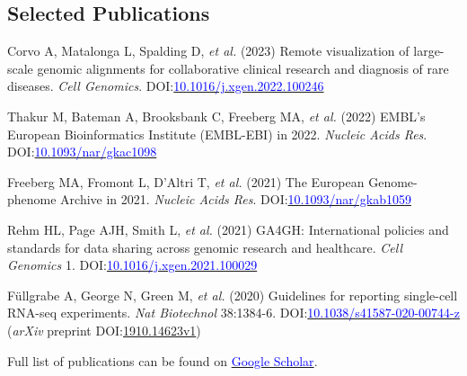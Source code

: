 \documentclass[margin,line]{res}
\begin{document}
\begin{resume}
\section{\sc Selected Publications}

Corvo A, Matalonga L, Spalding D, {\em et al.} (2023) Remote visualization of large-scale genomic alignments for collaborative clinical research and diagnosis of rare diseases. {\em Cell Genomics}. DOI:\href{https://doi.org/10.1016/j.xgen.2022.100246}{\textcolor{blue}{10.1016/j.xgen.2022.100246}}

Thakur M, Bateman A, Brooksbank C, Freeberg MA, {\em et al.} (2022) EMBL's European Bioinformatics Institute (EMBL-EBI) in 2022. {\em Nucleic Acids Res}. DOI:\href{https://doi.org/10.1093/nar/gkac1098}{\textcolor{blue}{10.1093/nar/gkac1098}}

Freeberg MA, Fromont L, D'Altri T, {\em et al.} (2021) The European Genome-phenome Archive in 2021. {\em Nucleic Acids Res}. DOI:\href{https://doi.org/10.1093/nar/gkab1059}{\textcolor{blue}{10.1093/nar/gkab1059}}

Rehm HL, Page AJH, Smith L, {\em et al.} (2021) GA4GH: International policies and standards for data sharing across genomic research and healthcare. {\em Cell Genomics} 1. DOI:\href{https://doi.org/10.1016/j.xgen.2021.100029}{\textcolor{blue}{10.1016/j.xgen.2021.100029}}


Füllgrabe A, George N, Green M, {\em et al.} (2020) Guidelines for reporting single-cell RNA-seq experiments. {\em Nat Biotechnol} 38:1384-6. DOI:\href{https://www.nature.com/articles/s41587-020-00744-z}{\textcolor{blue}{10.1038/s41587-020-00744-z}} ({\em arXiv} preprint DOI:\href{https://arxiv.org/abs/1910.14623}{{1910.14623v1}})


\Rightarrow  Full list of publications can be found on \href{https://scholar.google.com/citations?user=2LCcJA0AAAAJ&hl=en}{\textcolor{blue}{Google Scholar}}.


\end{resume}
\end{document}
